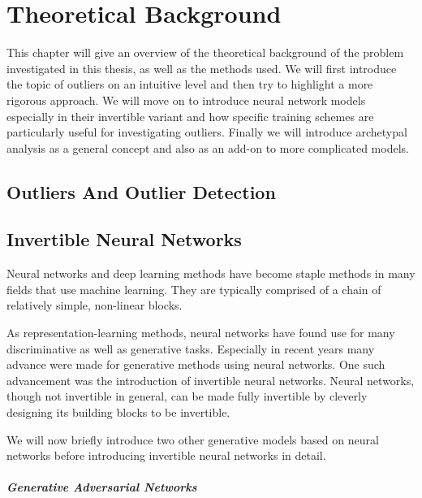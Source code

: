 \chapter{Theoretical Background}%
\label{cha:background}

This chapter will give an overview of the theoretical background of the problem
investigated in this thesis, as well as the methods used. We will first
introduce the topic of outliers on an intuitive level and then try to highlight
a more rigorous approach. We will move on to introduce neural network models
especially in their invertible variant and how specific training schemes are
particularly useful for investigating outliers. Finally we will introduce
archetypal analysis as a general concept and also as an add-on to more
complicated models.


\section{Outliers And Outlier Detection}%
\label{sec:outliers_an_outlier_detection}



\section{Invertible Neural Networks}%
\label{sec:invertible_neural_networks}

Neural networks and deep learning methods have become staple methods in many
fields that use machine learning. They are typically comprised of a chain of relatively
simple, non-linear blocks.~\citep{lecunDeepLearning2015}

As representation-learning methods, neural networks have found use for
many discriminative as well as generative tasks. Especially in recent years
many advance were made for generative methods using neural networks. One such
advancement was the introduction of invertible neural networks. Neural
networks, though not invertible in general, can be made fully invertible by
cleverly designing its building blocks to be invertible.

We will now briefly introduce two other generative models based on neural networks
before introducing invertible neural networks in detail.

\paragraph{Generative Adversarial Networks}%
\label{par:generative_adversarial_networks}


